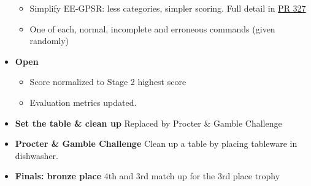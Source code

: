 \begin{itemize}
\begin{itemize}
			\item Simplify EE-GPSR: less categories, simpler scoring. Full detail in \href{https://github.com/RoboCupAtHome/RuleBook/pull/327}{PR 327}
			\item One of each, normal, incomplete and erroneous commands (given randomly)
		\end{itemize}
	\item \textbf{Open} 
		\begin{itemize}
			\item Score normalized to Stage 2 highest score
			\item Evaluation metrics updated.
		\end{itemize}
	\item \textbf{Set the table \& clean up} Replaced by Procter \& Gamble Challenge
	\item \textbf{Procter \& Gamble Challenge} Clean up a table by placing tableware in dishwasher.
	\item \textbf{Finals: bronze place} 4th and 3rd match up for the 3rd place trophy
\end{itemize}